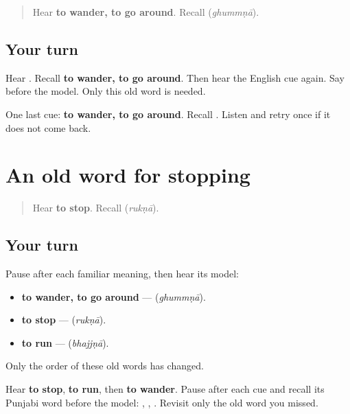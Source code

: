\label{lesson:PA-R166-wander-again}



\begin{quote}
Hear \textbf{to wander, to go around}. Recall \textbf{} (\emph{ghummṇā}).
\end{quote}

\subsection*{Your turn}
Hear \textbf{}. Recall \textbf{to wander, to go around}. Then hear the English cue again. Say \textbf{} before the model. Only this old word is needed.

\begin{tcolorbox}[breakable,colback=teal!4,colframe=teal!35!black,title={Before you move on}]
One last cue: \textbf{to wander, to go around}. Recall \textbf{}. Listen and retry once if it does not come back.
\end{tcolorbox}
\section[\texorpdfstring{\pa{ਰੁਕਣਾ} (rukṇā)}{ਰੁਕਣਾ (rukṇā)}]{An old word for stopping}

\label{lesson:PA-R166-stop-again}



\begin{quote}
Hear \textbf{to stop}. Recall \textbf{} (\emph{rukṇā}).
\end{quote}

\subsection*{Your turn}
Pause after each familiar meaning, then hear its model:

\begin{itemize}
\raggedright
  \item \textbf{to wander, to go around} — \textbf{} (\emph{ghummṇā}).
  \item \textbf{to stop} — \textbf{} (\emph{rukṇā}).
  \item \textbf{to run} — \textbf{} (\emph{bhajjṇā}).
\end{itemize}

Only the order of these old words has changed.

\begin{tcolorbox}[breakable,colback=teal!4,colframe=teal!35!black,title={Before you move on}]
Hear \textbf{to stop}, \textbf{to run}, then \textbf{to wander}. Pause after each cue and recall its Punjabi word before the model: \textbf{}, \textbf{}, \textbf{}. Revisit only the old word you missed.
\end{tcolorbox}
